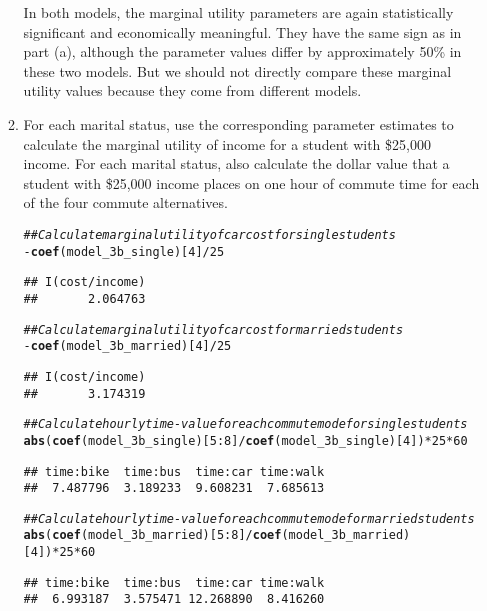 \documentclass[11pt,letterpaper]{article}\usepackage[]{graphicx}\usepackage[]{color}
\makeatletter
\newcommand{\hlnum}[1]{\textcolor[rgb]{0.686,0.059,0.569}{#1}}%
\newcommand{\hlcom}[1]{\textcolor[rgb]{0.678,0.584,0.686}{\textit{#1}}}%
\newcommand{\hlopt}[1]{\textcolor[rgb]{0,0,0}{#1}}%
\newcommand{\hlstd}[1]{\textcolor[rgb]{0.345,0.345,0.345}{#1}}%
\newcommand{\hlkwd}[1]{\textcolor[rgb]{0.737,0.353,0.396}{\textbf{#1}}}%
\newenvironment{kframe}{%
 \def\at@end@of@kframe{}%
 \ifinner\ifhmode%
  \def\at@end@of@kframe{\end{minipage}}%
  \begin{minipage}{\columnwidth}%
 \fi\fi%
 \def\FrameCommand##1{\hskip\@totalleftmargin \hskip-\fboxsep
 \colorbox{shadecolor}{##1}\hskip-\fboxsep
     \hskip-\linewidth \hskip-\@totalleftmargin \hskip\columnwidth}%
 \MakeFramed {\advance\hsize-\width
   \@totalleftmargin\z@ \linewidth\hsize
   \@setminipage}}%
 {\par\unskip\endMakeFramed%
 \at@end@of@kframe}
\newenvironment{knitrout}{}{} %
\makeatother
\begin{document}
\begin{enumerate}[label=\alph*., leftmargin=*]
\begin{enumerate}[label=\roman*.]
		In both models, the marginal utility parameters are again statistically significant and economically meaningful. They have the same sign as in part (a), although the parameter values differ by approximately 50\% in these two models. But we should not directly compare these marginal utility values because they come from different models.

		\item For each marital status, use the corresponding parameter estimates to calculate the marginal utility of income for a student with \$25,000 income. For each marital status, also calculate the dollar value that a student with \$25,000 income places on one hour of commute time for each of the four commute alternatives.

\begin{knitrout}
\color{fgcolor}\begin{kframe}
\begin{alltt}
\hlcom{## Calculate marginal utility of car cost for single students}
\hlopt{-}\hlkwd{coef}\hlstd{(model_3b_single)[}\hlnum{4}\hlstd{]} \hlopt{/} \hlnum{25}
\end{alltt}
\begin{verbatim}
## I(cost/income) 
##       2.064763
\end{verbatim}
\begin{alltt}
\hlcom{## Calculate marginal utility of car cost for married students}
\hlopt{-}\hlkwd{coef}\hlstd{(model_3b_married)[}\hlnum{4}\hlstd{]} \hlopt{/} \hlnum{25}
\end{alltt}
\begin{verbatim}
## I(cost/income) 
##       3.174319
\end{verbatim}
\begin{alltt}
\hlcom{## Calculate hourly time-value for each commute mode for single students}
\hlkwd{abs}\hlstd{(}\hlkwd{coef}\hlstd{(model_3b_single)[}\hlnum{5}\hlopt{:}\hlnum{8}\hlstd{]} \hlopt{/} \hlkwd{coef}\hlstd{(model_3b_single)[}\hlnum{4}\hlstd{])} \hlopt{*} \hlnum{25} \hlopt{*} \hlnum{60}
\end{alltt}
\begin{verbatim}
## time:bike  time:bus  time:car time:walk 
##  7.487796  3.189233  9.608231  7.685613
\end{verbatim}
\begin{alltt}
\hlcom{## Calculate hourly time-value for each commute mode for married students}
\hlkwd{abs}\hlstd{(}\hlkwd{coef}\hlstd{(model_3b_married)[}\hlnum{5}\hlopt{:}\hlnum{8}\hlstd{]} \hlopt{/} \hlkwd{coef}\hlstd{(model_3b_married)[}\hlnum{4}\hlstd{])} \hlopt{*} \hlnum{25} \hlopt{*} \hlnum{60}
\end{alltt}
\begin{verbatim}
## time:bike  time:bus  time:car time:walk 
##  6.993187  3.575471 12.268890  8.416260
\end{verbatim}
\end{kframe}
\end{knitrout}


\end{enumerate}
\end{enumerate}
\end{document}
